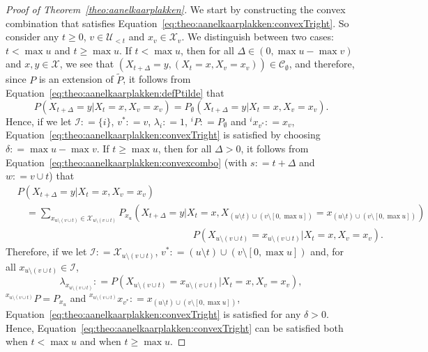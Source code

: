 \documentclass[10pt,a4paper]{paper}
\theoremstyle{definition}
\newcommand{\states}{\mathcal{X}}
\newcommand{\coloneqq}{:\!=}
\begin{document}
\begin{proof}[Proof of Theorem~\ref{theo:aanelkaarplakken}]
We start by constructing the convex combination that satisfies Equation~\eqref{eq:theo:aanelkaarplakken:convexTright}. So consider any $t\geq0$, $v\in\mathcal{U}_{<t}$ and $x_v\in\states_v$.
We distinguish between two cases: $t<\max u$ and $t\geq\max u$. If $t<\max u$, then for all $\Delta\in(0,\max u-\max v)$ and $x,y\in\states$, we see that $(X_{t+\Delta}=y,(X_t=x, X_v=x_v))\in\mathcal{C}_\emptyset$, and therefore, since $P$ is an extension of $\tilde{P}$, it follows from Equation~\eqref{eq:theo:aanelkaarplakken:defPtilde} that
\begin{equation*}
P(X_{t+\Delta}=y\vert X_t=x, X_v=x_v)
=P_\emptyset(X_{t+\Delta}=y\vert X_t=x, X_v=x_v).
\end{equation*}
Hence, if we let $\mathcal{I}\coloneqq\{i\}$, $v^*\coloneqq v$, $\lambda_i\coloneqq 1$, ${}^iP\coloneqq P_\emptyset$ and ${}^ix_{v^*}\coloneqq x_v$, Equation~\eqref{eq:theo:aanelkaarplakken:convexTright} is satisfied by choosing $\delta\coloneqq \max u-\max v$.
If $t\geq \max u$, then for all $\Delta>0$, it follows from Equation~\eqref{eq:theo:aanelkaarplakken:convexcombo} (with $s\coloneqq t+\Delta$ and $w\coloneqq v\cup t$) that
\begin{align*}
&P(X_{t+\Delta}=y\vert X_t=x, X_v=x_v)\\
&~~~~=
\sum_{x_{u\setminus(v\cup t)}\in\states_{u\setminus(v\cup t)}}
P_{x_u}(X_{t+\Delta}=y\vert X_t=x, 
X_{(u\setminus t)\cup(v\setminus [0,\max u])}= 
x_{(u\setminus t)\cup(v\setminus [0,\max u])})\\[-4mm]
&\quad\quad\quad\quad\quad\quad\quad\quad\quad\quad\quad\quad\quad\quad\quad\quad\quad\quad
P(X_{u\setminus(v\cup t)}=x_{u\setminus(v\cup t)}
\vert X_t=x, X_v=x_v).
\end{align*}
Therefore, if we let $\mathcal{I}\coloneqq\states_{u\setminus(v\cup t)}$, $v^*\coloneqq (u\setminus t)\cup(v\setminus [0,\max u])$ and, for all $x_{u\setminus(v\cup t)}\in \mathcal{I}$,
\begin{equation*}
\lambda_{x_{u\setminus(v\cup t)}}
\coloneqq P(X_{u\setminus(v\cup t)}=x_{u\setminus(v\cup t)}
\vert X_t=x, X_v=x_v),
\end{equation*}
${}^{x_{u\setminus(v\cup t)}}P=P_{x_u}$ and ${}^{x_{u\setminus(v\cup t)}}x_{v^*}\coloneqq
x_{(u\setminus t)\cup(v\setminus [0,\max u])}$, Equation~\eqref{eq:theo:aanelkaarplakken:convexTright} is satisfied for any $\delta>0$.
Hence, Equation~\eqref{eq:theo:aanelkaarplakken:convexTright} can be satisfied both when $t<\max u$ and when $t\geq \max u$.


\end{proof}
\end{document}

